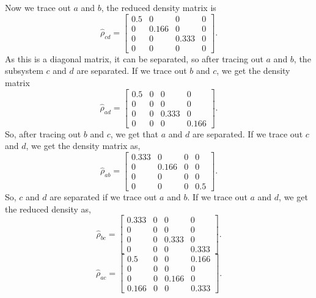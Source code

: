 \documentclass{amsart}
\theoremstyle{plain}
\theoremstyle{definition}
\theoremstyle{plain}
\begin{document}
Now we trace out $a$ and $b$, the reduced density matrix is 
\begin{equation*}
	\hat{\rho}_{cd} = \left[\begin{matrix}0.5 & 0 & 0 & 0\\0 & 0.166 & 0 & 0\\0 & 0 & 0.333 & 0\\0 & 0 & 0 & 0\end{matrix}\right]
	.
\end{equation*}
As this is a diagonal matrix, it can be separated, so after tracing out $a$ and $b$, the subsystem $c$ and $d$ are separated.
If we trace out $b$ and $c$, we get the density matrix
\begin{equation*}
	\hat{\rho}_{ad} =\left[\begin{matrix}0.5 & 0 & 0 & 0\\0 & 0 & 0 & 0\\0 & 0 & 0.333 & 0\\0 & 0 & 0 & 0.166\end{matrix}\right]
	.
\end{equation*}
So, after tracing out $b$ and $c$, we get that $a$ and $d$ are separated. 
If we trace out $c$ and $d$, we get the density matrix as,
\begin{equation*}
	\hat{\rho}_{ab} = \left[\begin{matrix}0.333 & 0 & 0 & 0\\0 & 0.166 & 0 & 0\\0 & 0 & 0 & 0\\0 & 0 & 0 & 0.5\end{matrix}\right]
	.
\end{equation*}
So, $c$ and $d$ are separated if we trace out $a$ and $b$.
If we trace out $a$ and  $d$, we get the reduced density as,
\begin{equation*}
	\hat{\rho}_{bc} = \left[\begin{matrix}0.333 & 0 & 0 & 0\\0 & 0 & 0 & 0\\0 & 0 & 0.333 & 0\\0 & 0 & 0 & 0.333\end{matrix}\right]
	.
\end{equation*}
\begin{equation*}
	\hat{\rho}_{ac} = \left[\begin{matrix}0.5 & 0 & 0 & 0.166\\0 & 0 & 0 & 0\\0 & 0 & 0.166 & 0\\0.166 & 0 & 0 & 0.333\end{matrix}\right]
	.
\end{equation*}
\end{document}

